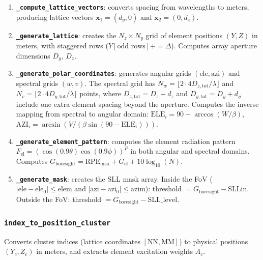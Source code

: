 \documentclass[11pt,a4paper]{article}
\begin{document}
\begin{enumerate}
    \item \textbf{\texttt{\_compute\_lattice\_vectors}}: converts spacing from wavelengths
          to meters, producing lattice vectors $\mathbf{x}_1 = (d_y, 0)$ and
          $\mathbf{x}_2 = (0, d_z)$.

    \item \textbf{\texttt{\_generate\_lattice}}: creates the $N_z \times N_y$ grid of
          element positions $(Y, Z)$ in meters, with staggered rows
          ($Y[\text{odd rows}] += \Delta$).
          Computes array aperture dimensions $D_y$, $D_z$.

    \item \textbf{\texttt{\_generate\_polar\_coordinates}}: generates angular grids
          $(\text{ele}, \text{azi})$ and spectral grids $(w, v)$.
          The spectral grid has $N_w = \lfloor 2 \cdot 4 D_{z,\text{tot}} / \lambda \rfloor$ and
          $N_v = \lfloor 2 \cdot 4 D_{y,\text{tot}} / \lambda \rfloor$ points,
          where $D_{z,\text{tot}} = D_z + d_z$ and $D_{y,\text{tot}} = D_y + d_y$
          include one extra element spacing beyond the aperture.
          Computes the inverse mapping from spectral to angular domain:
          $\text{ELE}_i = 90 - \arccos(W/\beta)$, $\text{AZI}_i = \arcsin(V / (\beta \sin(90 - \text{ELE}_i)))$.

    \item \textbf{\texttt{\_generate\_element\_pattern}}: computes the element radiation
          pattern $F_{\text{el}} = (\cos(0.9\theta) \cos(0.9\phi))^P$ in both angular
          and spectral domains. Computes $G_{\text{boresight}} = \text{RPE}_{\max} + G_{\text{el}} + 10\log_{10}(N)$.

    \item \textbf{\texttt{\_generate\_mask}}: creates the SLL mask array.
          Inside the FoV ($|\text{ele} - \text{ele}_0| \le \text{elem}$ and
          $|\text{azi} - \text{azi}_0| \le \text{azim}$): threshold $= G_{\text{boresight}} - \text{SLLin}$.
          Outside the FoV: threshold $= G_{\text{boresight}} - \text{SLL\_level}$.
\end{enumerate}

\subsubsection{\texttt{index\_to\_position\_cluster}}
Converts cluster indices (lattice coordinates $[\text{NN}, \text{MM}]$) to physical
positions $(Y_c, Z_c)$ in meters, and extracts element excitation weights $A_c$.
\end{document}
